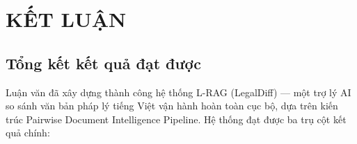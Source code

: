 \chapter{KẾT LUẬN}

\section{Tổng kết kết quả đạt được}

Luận văn đã xây dựng thành công hệ thống L-RAG (LegalDiff) — một trợ lý AI so sánh văn bản pháp lý tiếng Việt vận hành hoàn toàn cục bộ, dựa trên kiến trúc Pairwise Document Intelligence Pipeline. Hệ thống đạt được ba trụ cột kết quả chính:

